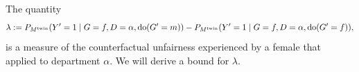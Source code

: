 \begin{enumerate}[resume*]
{%
    }
\end{enumerate}

The quantity 
  $$ \lambda := P_{M^{\mathrm{twin}}}(Y'=1 \mid G=f,D=\alpha,\operatorname{do}(G'=m)) - P_{M^{\mathrm{twin}}}(Y'=1 \mid G=f,D=\alpha,\operatorname{do}(G'=f)), $$
is a measure of the counterfactual unfairness experienced by a female that applied to department $\alpha$. 
We will derive a bound for $\lambda$.

